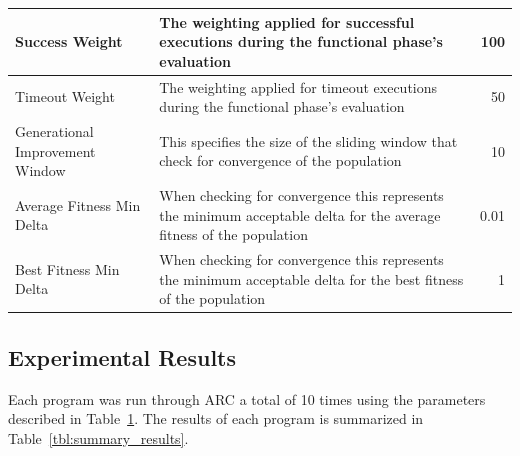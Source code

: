 \documentclass{llncs}
\begin{document}
\begin{table}[!t]
\begin{center}
\begin{tabular}{|p{3cm}|p{10cm}|r|}
\hline
Success Weight & The weighting applied for successful executions during the functional phase's evaluation & 100\\
\hline
Timeout Weight & The weighting applied for timeout executions during the functional phase's evaluation & 50\\
\hline
Generational Improvement Window & This specifies the size of the sliding window that check for convergence of the population & 10\\
\hline
Average Fitness Min Delta & When checking for convergence this represents the minimum acceptable delta for the average fitness of the population & 0.01\\
\hline
Best Fitness Min Delta & When checking for convergence this represents the minimum acceptable delta for the best fitness of the population & 1\\
\hline
\end{tabular}
\label{tbl:used_parameters}
\end{center}
\end{table}

\subsection{Experimental Results}
\label{sec:experimental_results}

Each program was run through ARC a total of 10 times using the parameters
described in Table~\ref{tbl:used_parameters}. The results of each program is
summarized in Table~\ref{tbl:summary_results}.
\end{document}
